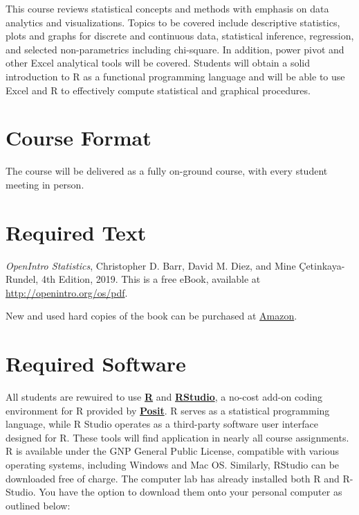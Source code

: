 \documentclass[11pt,]{article}
\begin{document}
This course reviews statistical concepts and methods with emphasis on
data analytics and visualizations. Topics to be covered include
descriptive statistics, plots and graphs for discrete and continuous
data, statistical inference, regression, and selected non-parametrics
including chi-square. In addition, power pivot and other Excel
analytical tools will be covered. Students will obtain a solid
introduction to R as a functional programming language and will be able
to use Excel and R to effectively compute statistical and graphical
procedures.

\hypertarget{course-format}{%
\section{Course Format}\label{course-format}}

The course will be delivered as a fully on-ground course, with every
student meeting in person.

\hypertarget{required-text}{%
\section{Required Text}\label{required-text}}

\emph{OpenIntro Statistics}, Christopher D. Barr, David M. Diez, and
Mine Çetinkaya-Rundel, 4th Edition, 2019. This is a free eBook,
available at \url{http://openintro.org/os/pdf}.

New and used hard copies of the book can be purchased at
\href{https://www.amazon.com/OpenIntro-Statistics-Fourth-color-interior/dp/1943450226/ref=sr_1_1?crid=XKV3CDPZPZDG\&keywords=OpenIntro+Statistics\&qid=1692970332\&sprefix=openintro+statistics\%2Caps\%2C84\&sr=8-1}{Amazon}.

\hypertarget{required-software}{%
\section{Required Software}\label{required-software}}

All students are rewuired to use
\href{https://www.r-project.org}{\textbf{R}} and
\href{https://posit.co/products/open-source/rstudio/}{\textbf{RStudio}},
a no-cost add-on coding environment for R provided by
\href{https://posit.co}{\textbf{Posit}}. R serves as a statistical
programming language, while R Studio operates as a third-party software
user interface designed for R. These tools will find application in
nearly all course assignments. R is available under the GNP General
Public License, compatible with various operating systems, including
Windows and Mac OS. Similarly, RStudio can be downloaded free of charge.
The computer lab has already installed both R and R-Studio. You have the
option to download them onto your personal computer as outlined below:
\end{document}
